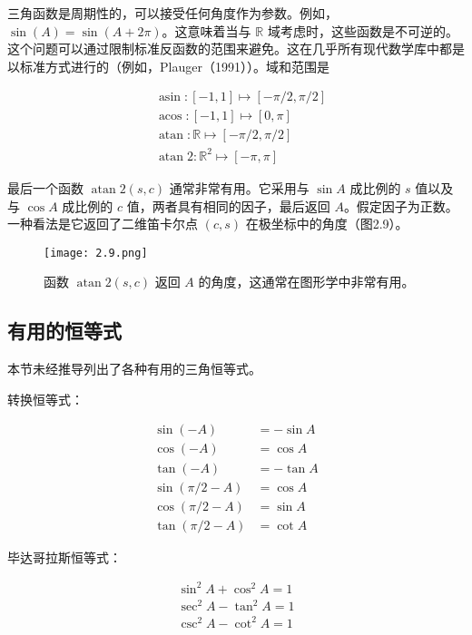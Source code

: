 \documentclass[lang=cn,12pt]{elegantbook}
\begin{document}
三角函数是周期性的，可以接受任何角度作为参数。例如，$\sin(A) = \sin(A + 2\pi)$。这意味着当与 $\mathbb{R}$ 域考虑时，这些函数是不可逆的。这个问题可以通过限制标准反函数的范围来避免。这在几乎所有现代数学库中都是以标准方式进行的（例如，Plauger（1991））。域和范围是

\begin{equation}
\begin{aligned}
&\operatorname{asin}:[-1,1] \mapsto[-\pi / 2, \pi / 2] \\
&\operatorname{acos}:[-1,1] \mapsto[0, \pi] \\
&\operatorname{atan}: \mathbb{R} \mapsto[-\pi / 2, \pi / 2] \\
&\operatorname{atan} 2: \mathbb{R}^{2} \mapsto[-\pi, \pi]
\end{aligned}
\end{equation}

最后一个函数 $\operatorname{atan} 2(s,c)$ 通常非常有用。它采用与 $\sin A$ 成比例的 $s$ 值以及与 $\cos A$ 成比例的 $c$ 值，两者具有相同的因子，最后返回 $A$。假定因子为正数。一种看法是它返回了二维笛卡尔点 $(c,s)$ 在极坐标中的角度（图2.9）。

\begin{figure}[htbp]
\centering
\texttt{[image: 2.9.png]}
\caption{函数 $\operatorname{atan} 2(s,c)$ 返回 $A$ 的角度，这通常在图形学中非常有用。}
\end{figure}

\subsection{有用的恒等式}

本节未经推导列出了各种有用的三角恒等式。

转换恒等式：

$$
\begin{aligned}
\sin (-A) &=-\sin A \\
\cos (-A) &=\cos A \\
\tan (-A) &=-\tan A \\
\sin (\pi / 2-A) &=\cos A \\
\cos (\pi / 2-A) &=\sin A \\
\tan (\pi / 2-A) &=\cot A
\end{aligned}
$$

毕达哥拉斯恒等式：

$$
\begin{array}{r}
\sin ^{2} A+\cos ^{2} A=1 \\
\sec ^{2} A-\tan ^{2} A=1 \\
\csc ^{2} A-\cot ^{2} A=1
\end{array}
$$
\end{document}
